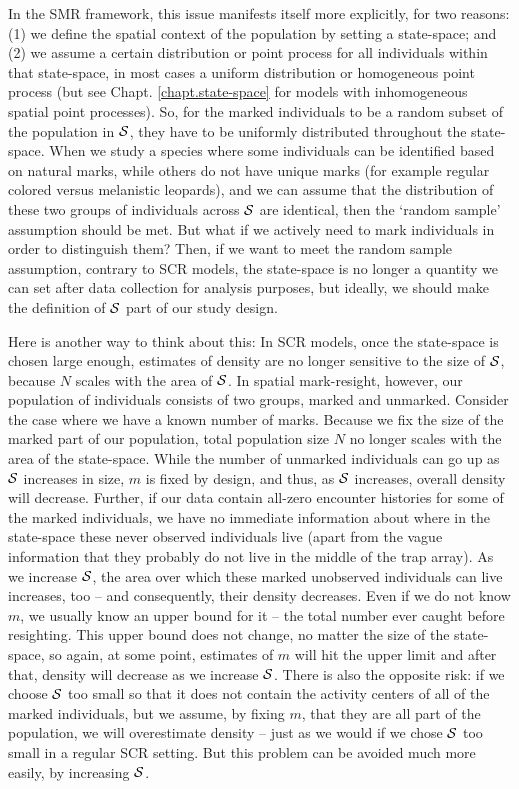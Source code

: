 In the SMR framework, this issue manifests itself more explicitly, for
two reasons: (1) we define the spatial context of the population by
setting a state-space; and (2) we assume a certain distribution or
point process for all individuals within that state-space, in most
cases a uniform distribution or homogeneous point process (but see
Chapt. \ref{chapt.state-space} for models with inhomogeneous spatial
point processes). So, for the marked individuals to be a random
subset %
of the population in %
${\cal S}$, they have to be uniformly distributed throughout the state-space. When we study a species where some individuals can be identified based on natural marks, while others do not have unique marks (for example regular colored versus melanistic leopards), and we can assume that the distribution of these two groups of individuals across ${\cal S}$ are identical, then the `random sample' assumption should be met. But what if we actively need to mark individuals in order to distinguish them?
Then, %
if we want to meet the random sample assumption, contrary to SCR models, the state-space is no longer a quantity we can set after data collection for analysis purposes, but ideally, we should make the definition of ${\cal S}$ part of our study design.

Here is another way to think about this: In SCR models, once the state-space is chosen large enough, estimates of density are no longer sensitive to the size of ${\cal S}$, because $N$ scales with the area of ${\cal S}$. In spatial mark-resight, however, our population of individuals consists of two groups, marked and unmarked. Consider the case where we have a known number of marks. Because we fix the size of the marked part of
our population, total population size $N$ no longer scales with the
area of the state-space. While the number of unmarked individuals can
go up as ${\cal S}$ increases in size, $m$ is fixed by design, and thus, as ${\cal S}$ increases, overall density will decrease. Further, if our
data contain all-zero encounter histories for some of the marked
individuals, we have no immediate information about where in the
state-space these never observed individuals live (apart from the
vague information that they probably do not live in the middle of the
trap array). As we increase ${\cal S}$, the area over which these marked
unobserved individuals can live increases, too -- and consequently,
their density decreases. Even if we do not know $m$, we usually know an upper bound for it -- the total number ever caught before resighting. This upper bound does not change, no matter the size of the state-space, so again, at some point, estimates of $m$ will hit the upper limit and after that, density will decrease as we increase ${\cal S}$. There is also the opposite risk: if we choose ${\cal S}$
too small so that it does not contain the activity centers of all of
the marked individuals, but we assume, by fixing $m$, that they are
all part of the population, we will overestimate density -- just as we
would if we chose ${\cal S}$ too small in a regular SCR setting. But this problem can be avoided much more easily, by increasing ${\cal S}$.

